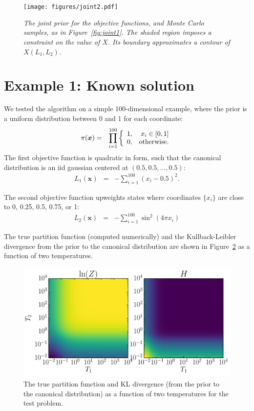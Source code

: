 \documentclass[journal,article,accept,moreauthors,pdftex,12pt,a4paper]{mdpi}
\newcommand{\xx}{\boldsymbol{x}}
\begin{document}

\begin{figure}
\centering
\texttt{[image: figures/joint2.pdf]}
\caption{\it The joint prior for the objective functions, and Monte Carlo
samples, as in Figure~\ref{fig:joint1}. The shaded region imposes a
constraint on the value of $\hat{X}$. Its boundary approximates a contour
of $X(L_1, L_2)$.
\label{fig:joint2}}
\end{figure}

\section{Example 1: Known solution}
We tested the algorithm on a simple 100-dimensional example, where the
prior is a uniform distribution between 0 and 1 for each coordinate:
\begin{eqnarray}
\pi(\xx) &=& \prod_{i=1}^{100}
\left\{
\begin{array}{lr}
1, & x_i \in [0, 1]\\
0, & \textnormal{otherwise.}
\end{array}
\right.
\end{eqnarray}
The first objective function is quadratic in form, such that the canonical
distribution is an iid gaussian centered at $(0.5, 0.5, ..., 0.5)$:
\begin{eqnarray}
L_1(\xx) &=& -\sum_{i=1}^{100} \left(x_i - 0.5\right)^2.
\end{eqnarray}

The second objective function upweights states where coordinates $\{x_i\}$
are close to 0, 0.25, 0.5, 0.75, or 1:
\begin{eqnarray} 
L_2(\xx) &=& -\sum_{i=1}^{100} \sin^2(4\pi x_i)
\end{eqnarray}

The true partition function (computed numerically) and the Kullback-Leibler
divergence from the prior to the canonical distribution are shown in
Figure~\ref{fig:truth} as a function of two temperatures.

\begin{figure}
\centering
\includegraphics[scale=0.75]{figures/truth.pdf}
\caption{The true partition function and KL divergence (from the prior to
the canonical distribution) as a function of two temperatures for the
test problem.\label{fig:truth}}
\end{figure}
\end{document}
